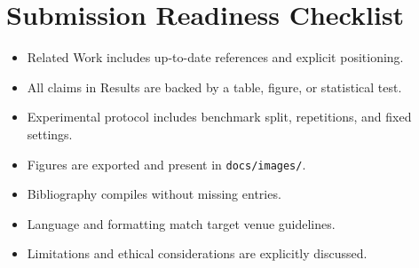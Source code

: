 \documentclass[11pt,a4paper]{article}
\begin{document}
\section*{Submission Readiness Checklist}

\begin{itemize}[leftmargin=1.2cm]
	\item Related Work includes up-to-date references and explicit positioning.
	\item All claims in Results are backed by a table, figure, or statistical test.
	\item Experimental protocol includes benchmark split, repetitions, and fixed settings.
	\item Figures are exported and present in \texttt{docs/images/}.
	\item Bibliography compiles without missing entries.
	\item Language and formatting match target venue guidelines.
	\item Limitations and ethical considerations are explicitly discussed.
\end{itemize}



\end{document}
